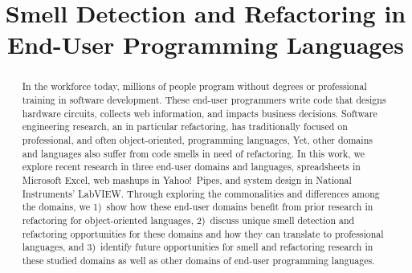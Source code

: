 \documentclass[10pt,conference,compsocconf]{IEEEtran}
\begin{document}
%
\title{Smell Detection and Refactoring in End-User Programming Languages}

\author{


\and
{}
}

\maketitle


\begin{abstract}
In the workforce today, millions of people program without degrees or professional training in software development. 
These end-user programmers write code that designs hardware circuits, collects web information, and impacts business decisions. 
Software engineering research, an in particular refactoring, has traditionally focused on professional, and often object-oriented, programming languages, 
Yet, other domains and languages also suffer from code smells in need of refactoring. 
In this work, we explore recent research in three end-user domains and languages, spreadsheets in Microsoft Excel, web mashups in Yahoo!\ Pipes, and system design in National Instruments' LabVIEW. 
Through exploring the commonalities and differences among the domains, we 1)~show how these end-user domains benefit from prior research in refactoring for object-oriented languages, 2)~discuss unique smell detection and refactoring opportunities for these domains and how they can translate to professional languages, and 3)~identify future opportunities for smell and refactoring research in these studied domains as well as other domains of end-user programming languages. 
\end{abstract}
\end{document}
